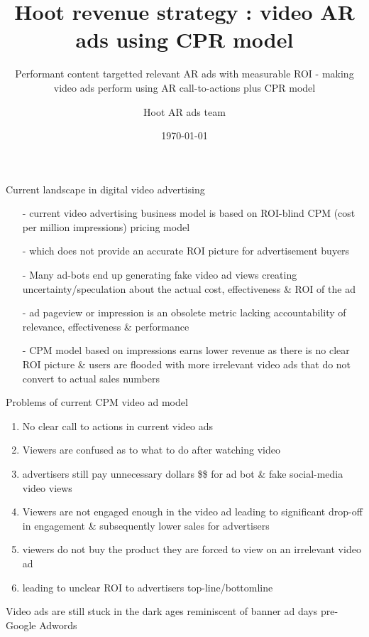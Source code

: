 \documentclass[10pt,handout]{beamer}
\title{ Hoot revenue strategy : video AR ads using CPR model}
\subtitle{Performant content targetted relevant AR ads with measurable ROI - making video ads perform using AR call-to-actions plus CPR model}
\date{\today}
\author{Hoot AR ads team}
\institute{Hoot Live inc., a Delaware C-corp}
\begin{document}
\maketitle



\begin{frame}[fragile]{Current landscape in digital video advertising}
 \begin{itemize}[<+-| alert@+>]%
	 
\item[-]current video advertising business model is based on ROI-blind CPM (cost per million impressions) pricing model
\item[-]which does not provide an accurate ROI picture for advertisement buyers
\item[-]Many ad-bots end up generating fake video ad views creating uncertainty/speculation about the actual cost, effectiveness \& ROI of the ad
\item[-]ad pageview or impression is an obsolete metric lacking accountability of relevance, effectiveness \& performance 
\item[-]CPM model based on impressions earns lower revenue as there is no clear ROI picture \& users are flooded with more irrelevant video ads that do not convert to actual sales numbers
\end{itemize}

\end{frame}
\begin{frame}[t]{Problems of current CPM video ad model}
\begin{enumerate}[<+-| alert@+>]
\item No clear call to actions in current video ads
\item Viewers are confused as to what to do after watching video
\item advertisers still pay unnecessary dollars \$\$ for ad bot \& fake social-media video views
\item Viewers are not engaged enough in the video ad leading to significant drop-off in engagement \& subsequently lower sales for advertisers
\item viewers do not buy the product they are forced to view on an irrelevant video ad
\item leading to unclear ROI to advertisers top-line/bottomline

\end{enumerate}
\pause
\Large{Video ads are still stuck in the dark ages reminiscent of banner ad days pre-Google Adwords}
\end{frame}
\end{document}
